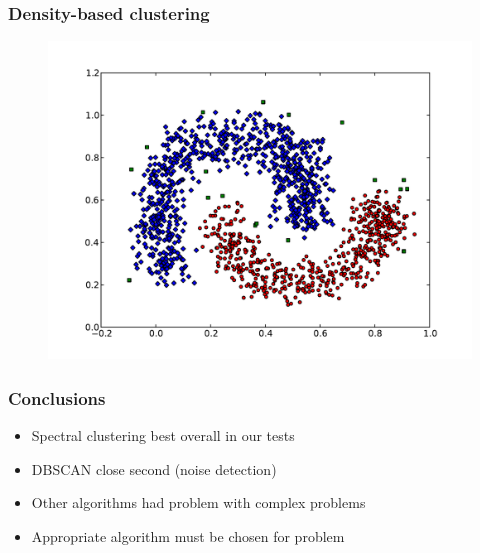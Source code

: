 \documentclass{beamer}
\begin{document}
\begin{frame}
\frametitle{Density-based clustering}
    \begin{figure}[]
    \includegraphics[scale=0.5]{dbscan_half-moons.pdf}
    \end{figure}
\end{frame}


\begin{frame}
\frametitle{Conclusions}
    \begin{itemize}
	\item Spectral clustering best overall in our tests
    	\item DBSCAN close second (noise detection)
	\item Other algorithms had problem with complex problems

   	\item Appropriate algorithm must be chosen for problem
    \end{itemize}
\end{frame}
\end{document}
